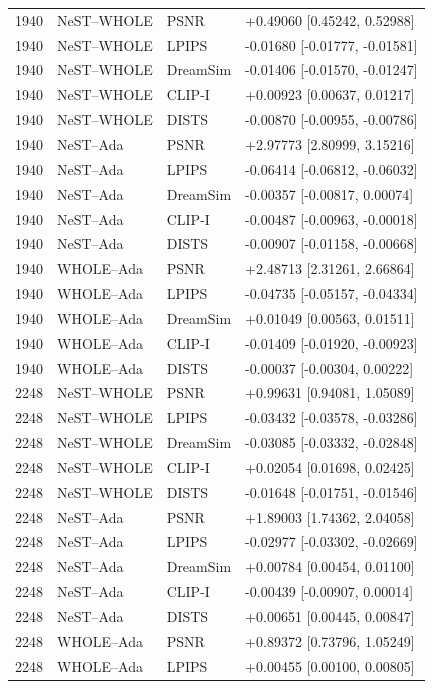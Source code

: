\documentclass[10pt,letterpaper]{article}
\begin{document}
\begin{longtable}{@{}rlll@{}}
1940 & NeST--WHOLE & PSNR & +0.49060 [0.45242, 0.52988]\\
1940 & NeST--WHOLE & LPIPS & -0.01680 [-0.01777, -0.01581]\\
1940 & NeST--WHOLE & DreamSim & -0.01406 [-0.01570, -0.01247]\\
1940 & NeST--WHOLE & CLIP-I & +0.00923 [0.00637, 0.01217]\\
1940 & NeST--WHOLE & DISTS & -0.00870 [-0.00955, -0.00786]\\
1940 & NeST--Ada & PSNR & +2.97773 [2.80999, 3.15216]\\
1940 & NeST--Ada & LPIPS & -0.06414 [-0.06812, -0.06032]\\
1940 & NeST--Ada & DreamSim & -0.00357 [-0.00817, 0.00074]\\
1940 & NeST--Ada & CLIP-I & -0.00487 [-0.00963, -0.00018]\\
1940 & NeST--Ada & DISTS & -0.00907 [-0.01158, -0.00668]\\
1940 & WHOLE--Ada & PSNR & +2.48713 [2.31261, 2.66864]\\
1940 & WHOLE--Ada & LPIPS & -0.04735 [-0.05157, -0.04334]\\
1940 & WHOLE--Ada & DreamSim & +0.01049 [0.00563, 0.01511]\\
1940 & WHOLE--Ada & CLIP-I & -0.01409 [-0.01920, -0.00923]\\
1940 & WHOLE--Ada & DISTS & -0.00037 [-0.00304, 0.00222]\\
2248 & NeST--WHOLE & PSNR & +0.99631 [0.94081, 1.05089]\\
2248 & NeST--WHOLE & LPIPS & -0.03432 [-0.03578, -0.03286]\\
2248 & NeST--WHOLE & DreamSim & -0.03085 [-0.03332, -0.02848]\\
2248 & NeST--WHOLE & CLIP-I & +0.02054 [0.01698, 0.02425]\\
2248 & NeST--WHOLE & DISTS & -0.01648 [-0.01751, -0.01546]\\
2248 & NeST--Ada & PSNR & +1.89003 [1.74362, 2.04058]\\
2248 & NeST--Ada & LPIPS & -0.02977 [-0.03302, -0.02669]\\
2248 & NeST--Ada & DreamSim & +0.00784 [0.00454, 0.01100]\\
2248 & NeST--Ada & CLIP-I & -0.00439 [-0.00907, 0.00014]\\
2248 & NeST--Ada & DISTS & +0.00651 [0.00445, 0.00847]\\
2248 & WHOLE--Ada & PSNR & +0.89372 [0.73796, 1.05249]\\
2248 & WHOLE--Ada & LPIPS & +0.00455 [0.00100, 0.00805]\\

\end{longtable}
\end{document}
